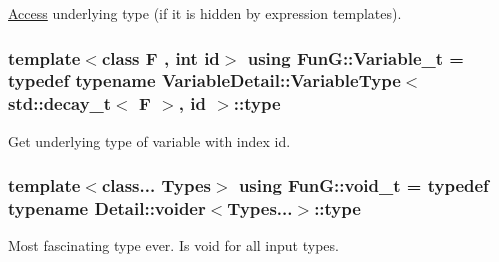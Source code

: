 \hyperlink{namespaceFunG_1_1Access}{Access} underlying type (if it is hidden by expression templates). 

\hypertarget{namespaceFunG_a1c6fc5c4c7cd6678b9de8962c14b86b5}{
\subsubsection[{Variable\-\_\-t}]{\setlength{\rightskip}{0pt plus 5cm}template$<$class F , int id$>$ using {\bf Fun\-G\-::\-Variable\-\_\-t} = typedef typename Variable\-Detail\-::\-Variable\-Type$<$ std\-::decay\-\_\-t$<$ F $>$, id $>$\-::type}}\label{namespaceFunG_a1c6fc5c4c7cd6678b9de8962c14b86b5}


Get underlying type of variable with index id. 

\hypertarget{namespaceFunG_a0cde667596590eb8d32e4a5ee76ddbb9}{
\subsubsection[{void\-\_\-t}]{\setlength{\rightskip}{0pt plus 5cm}template$<$class... Types$>$ using {\bf Fun\-G\-::void\-\_\-t} = typedef typename Detail\-::voider$<$Types...$>$\-::type}}\label{namespaceFunG_a0cde667596590eb8d32e4a5ee76ddbb9}


Most fascinating type ever. Is void for all input types. 



